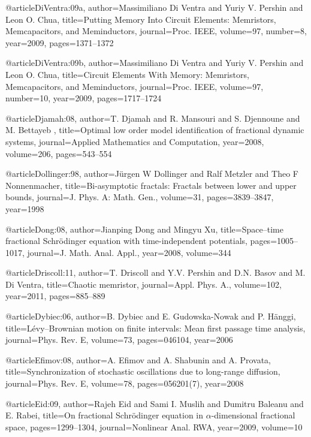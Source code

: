\begin{thebibliography}{99}
@article{DiVentra:09a,
  author={Massimiliano {Di Ventra} and Yuriy V. Pershin and Leon O. Chua},
  title={Putting Memory Into Circuit Elements: {M}emristors, {M}emcapacitors, and
    {M}eminductors},
  journal={Proc. IEEE},
  volume={97},
  number={8},
  year={2009},
  pages={1371--1372}
}

@article{DiVentra:09b,
  author={Massimiliano {Di Ventra} and Yuriy V. Pershin and Leon O. Chua},
  title={Circuit Elements With Memory: {M}emristors, {M}emcapacitors, and {M}eminductors},
  journal={Proc. IEEE},
  volume={97},
  number={10},
  year={2009},
  pages={1717--1724}
}

@article{Djamah:08,
  author={T. Djamah and R. Mansouri and S. Djennoune and M. Bettayeb },
  title={Optimal low order model identification of fractional dynamic systems},
  journal={Applied Mathematics and Computation},
  year={2008},
  volume={206},
  pages={543--554}
}

@article{Dollinger:98,
  author={J\"{u}rgen W Dollinger and Ralf Metzler and Theo F Nonnenmacher},
  title={Bi-asymptotic fractals: {F}ractals between lower and upper bounds},
  journal={J. Phys. A: Math. Gen.},
  volume={31},
  pages={3839--3847},
  year={1998}
}

@article{Dong:08,
  author={Jianping Dong and Mingyu Xu},
  title={Space--time fractional {S}chr\"{o}dinger equation with time-independent
    potentials},
  pages={1005--1017},
  journal={J. Math. Anal. Appl.},
  year={2008},
  volume={344}
}

@article{Driscoll:11,
  author={T. Driscoll and Y.V. Pershin and D.N. Basov and M. Di Ventra},
  title={Chaotic memristor},
  journal={Appl. Phys. A.},
  volume={102},
  year={2011},
  pages={885--889}
}

@article{Dybiec:06,
  author={B. Dybiec and E. Gudowska-{N}owak and P. H\"{a}nggi},
  title={L\'{e}vy--Brownian motion on finite intervals: {M}ean first passage time
    analysis},
  journal={Phys. Rev. E},
  volume={73},
  pages={046104},
  year={2006}
}

@article{Efimov:08,
  author={A. Efimov and A. Shabunin and A. Provata},
  title={Synchronization of stochastic oscillations due to long-range diffusion},
  journal={Phys. Rev. E},
  volume={78},
  pages={056201(7)},
  year={2008}
}

@article{Eid:09,
  author={Rajeh Eid and Sami I. Muslih and Dumitru Baleanu and E. Rabei},
  title={On fractional {S}chr\"{o}dinger equation in $\alpha$-dimensional fractional
    space},
  pages={1299--1304},
  journal={Nonlinear Anal. RWA},
  year={2009},
  volume={10}
}


\end{thebibliography}
